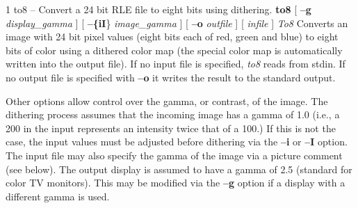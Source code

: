 %
%
%
 1
to8 -- Convert a 24 bit RLE file to eight bits using dithering.
{\bf to8}
[
{\bf --g}
{\it display\_gamma}
] [
{\bf --\{iI}\}
{\it image\_gamma}
] [
{\bf --o}
{\it outfile}
] [
{\it infile}
]
{\it To8}
Converts an image with 24 bit pixel values (eight bits each of red, green and
blue) to eight bits of color using a dithered color map (the special color
map is automatically written into the output file).
If no input file is specified, 
{\it to8}
reads from stdin.  If no output file is specified with
{\bf --o}
it writes the result to the standard output.

Other options allow control over the gamma, or contrast, of the image.
The dithering process assumes that the incoming image has a gamma of
1.0 (i.e., a 200 in the input represents an intensity twice that of
a 100.)  If this is not the case, the input values must be adjusted
before dithering via the
{\bf --i}
or 
{\bf --I}
option.  The input file may also specify the gamma of the image via a
picture comment (see below).  The output display is assumed to have a gamma of
2.5 (standard for color TV monitors).  This may be modified via the
{\bf --g}
option if a display with a different gamma is used.

